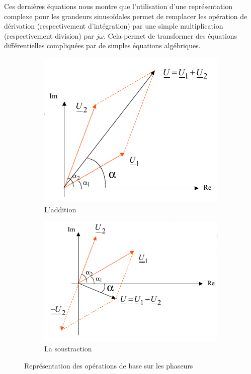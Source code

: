 \documentclass[12pt,a4paper]{article}
\begin{document}
Ces dernières équations nous montre que l'utilisation d'une représentation complexe pour les grandeurs sinusoïdales permet de remplacer les opération de dérivation (respectivement d'intégration) par une simple multiplication (respectivement division) par $j\omega$. Cela permet de transformer des équations différentielles compliquées par de simples équations algébriques.
\begin{figure}
	\centering
	\begin{subfigure}[b]{0.45\textwidth}
		\centering
		\includegraphics[scale=0.5]{images/phaseur_addition}
		\caption{L'addition}
	\end{subfigure}
	\begin{subfigure}[b]{0.45\textwidth}
		\centering
		\includegraphics[scale=0.5]{images/phaseur_soustraction}
		\caption{La soustraction}
	\end{subfigure}
	\caption{Représentation des opérations de base sur les phaseurs}
\end{figure}
\end{document}

